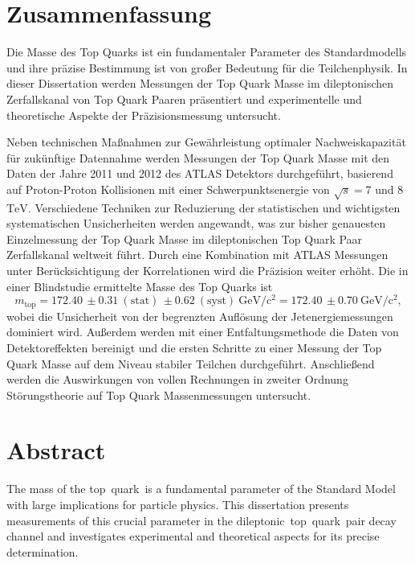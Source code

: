 \documentclass[a4paper,11pt,twoside,openright,notitlepage]{report}
\newcommand{\CombValue                 }{\ensuremath{172.40}\xspace}%
\newcommand{\CombStat                  }{\ensuremath{0.31}\xspace}
\newcommand{\CombSyst                  }{\ensuremath{0.62}\xspace}
\newcommand{\CombTot                   }{\ensuremath{0.70}\xspace}
\newcommand{\XZ           }[3]{\ensuremath{#1\,\pm #2~\mathrm{(stat)}\,\pm #3~\mathrm{(syst)}}\xspace}
\newcommand{\XZtot        }[2]{\ensuremath{#1\,\pm #2}\xspace}
\newcommand{\dileptonic   }{\ensuremath{\mbox{dileptonic}}\xspace}
\newcommand{\mt           }{\ensuremath{m_{\mathrm{top}}}\xspace}
\newcommand{\GeV            }{\ensuremath{\mathrm{GeV}\xspace}}
\newcommand{\TeV            }{\ensuremath{\mathrm{TeV}\xspace}}
\newcommand{\sqrts        }{\ensuremath{{\sqrt{s}}}\xspace}
\newcommand\tquark{top~quark\xspace}
\begin{document}
\pagestyle{empty}


\cleardoublepage

\chapter*{Zusammenfassung}
%
Die Masse des Top Quarks ist ein fundamentaler Parameter des Standardmodells und ihre pr\"azise Bestimmung ist von gro{\ss}er Bedeutung f\"ur die Teilchenphysik. In dieser Dissertation werden Messungen der Top Quark Masse im dileptonischen Zerfallskanal von Top Quark Paaren pr\"asentiert und experimentelle und theoretische Aspekte der Pr\"azisionsmessung untersucht.

Neben technischen Ma{\ss}nahmen zur Gew\"ahrleistung optimaler Nachweiskapazit\"at f\"ur zuk\"unftige Datennahme werden Messungen der Top Quark Masse mit den Daten der Jahre 2011 und 2012 des ATLAS Detektors durchgef\"uhrt, basierend auf Proton-Proton Kollisionen mit einer Schwerpunktsenergie von $\sqrts=7$ und $8$~\TeV. Verschiedene Techniken zur Reduzierung der statistischen und wichtigsten systematischen Unsicherheiten werden angewandt, was zur bisher genauesten Einzelmessung der Top Quark Masse im dileptonischen Top Quark Paar Zerfallskanal weltweit f\"uhrt. Durch eine Kombination mit ATLAS Messungen unter Ber\"ucksichtigung der Korrelationen wird die Pr\"azision weiter erh\"oht. Die in einer Blindstudie ermittelte Masse des Top Quarks ist
\[
\mt = \XZ{\CombValue}{\CombStat}{\CombSyst}~\GeV/\mathrm{c}^2 = \XZtot{\CombValue}{\CombTot}~\GeV/\mathrm{c}^2,
\]
wobei die Unsicherheit von der begrenzten Aufl\"osung der Jetenergiemessungen dominiert wird. Au{\ss}erdem werden mit einer Entfaltungsmethode die Daten von Detektoreffekten bereinigt und die ersten Schritte zu einer Messung der Top Quark Masse auf dem Niveau stabiler Teilchen durchgef\"uhrt. Anschlie{\ss}end werden die Auswirkungen von vollen  Rechnungen in zweiter Ordnung St\"orungstheorie auf Top Quark Massenmessungen untersucht.



\chapter*{Abstract}
%
The mass of the \tquark\ is a fundamental parameter of the Standard Model with large implications for particle physics. This dissertation presents measurements of this crucial parameter in the \dileptonic\ \tquark\ pair decay channel and investigates experimental and theoretical aspects for its precise determination.
\end{document}
